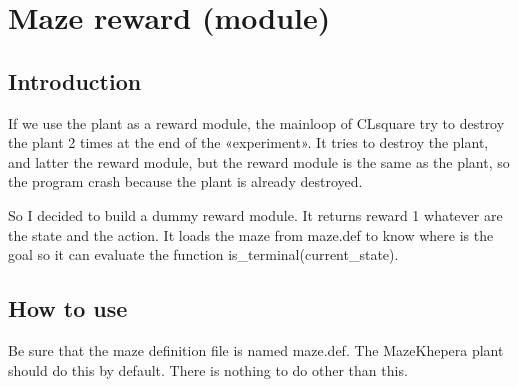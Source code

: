 \section{Maze reward (module)}

\subsection{Introduction}

If we use the plant as a reward module, the mainloop of CLsquare try to 
destroy 
the plant 2 times at the end of the «experiment». It tries to destroy 
the plant, and latter the reward module, but the reward module is the 
same as the plant, so the program crash because the plant is already 
destroyed. 

So I decided to build a dummy reward module. It returns reward 1 
whatever are the state and the action. It loads the maze from maze.def 
to know where is the goal so it can evaluate the function 
is\_terminal(current_state).

\subsection{How to use}

Be sure that the maze definition file is named maze.def. The MazeKhepera
plant should do this by default. There is nothing to do other than this.

